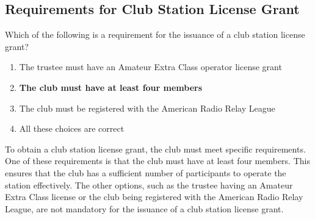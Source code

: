 \subsection{Requirements for Club Station License Grant}
\label{T1F11}

\begin{tcolorbox}[colback=gray!10!white,colframe=black!75!black,title=T1F11]
Which of the following is a requirement for the issuance of a club station license grant?
\begin{enumerate}[label=\Alph*,noitemsep]
    \item The trustee must have an Amateur Extra Class operator license grant
    \item \textbf{The club must have at least four members}
    \item The club must be registered with the American Radio Relay League
    \item All these choices are correct
\end{enumerate}
\end{tcolorbox}

To obtain a club station license grant, the club must meet specific requirements. One of these requirements is that the club must have at least four members. This ensures that the club has a sufficient number of participants to operate the station effectively. The other options, such as the trustee having an Amateur Extra Class license or the club being registered with the American Radio Relay League, are not mandatory for the issuance of a club station license grant.